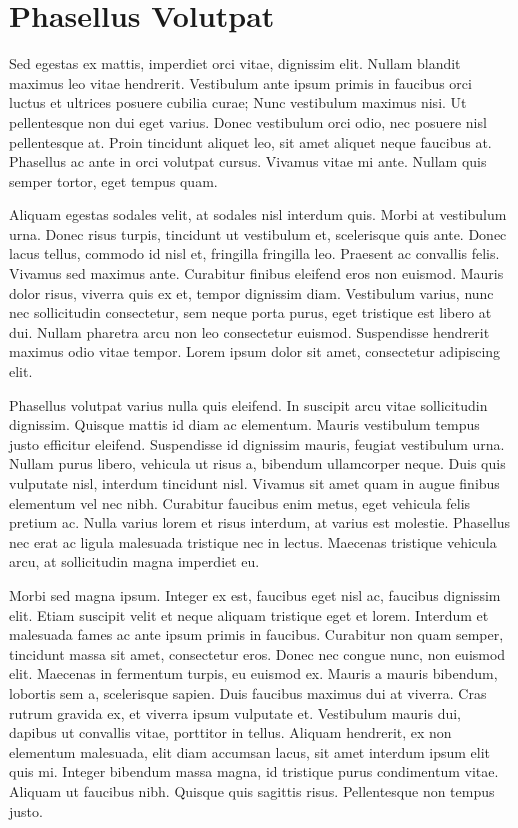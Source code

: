 \appendixhere

\chapter*{Phasellus Volutpat}

Sed egestas ex mattis, imperdiet orci vitae, dignissim elit. Nullam blandit maximus leo vitae hendrerit. Vestibulum ante ipsum primis in faucibus orci luctus et ultrices posuere cubilia curae; Nunc vestibulum maximus nisi. Ut pellentesque non dui eget varius. Donec vestibulum orci odio, nec posuere nisl pellentesque at. Proin tincidunt aliquet leo, sit amet aliquet neque faucibus at. Phasellus ac ante in orci volutpat cursus. Vivamus vitae mi ante. Nullam quis semper tortor, eget tempus quam.

Aliquam egestas sodales velit, at sodales nisl interdum quis. Morbi at vestibulum urna. Donec risus turpis, tincidunt ut vestibulum et, scelerisque quis ante. Donec lacus tellus, commodo id nisl et, fringilla fringilla leo. Praesent ac convallis felis. Vivamus sed maximus ante. Curabitur finibus eleifend eros non euismod. Mauris dolor risus, viverra quis ex et, tempor dignissim diam. Vestibulum varius, nunc nec sollicitudin consectetur, sem neque porta purus, eget tristique est libero at dui. Nullam pharetra arcu non leo consectetur euismod. Suspendisse hendrerit maximus odio vitae tempor. Lorem ipsum dolor sit amet, consectetur adipiscing elit.

Phasellus volutpat varius nulla quis eleifend. In suscipit arcu vitae sollicitudin dignissim. Quisque mattis id diam ac elementum. Mauris vestibulum tempus justo efficitur eleifend. Suspendisse id dignissim mauris, feugiat vestibulum urna. Nullam purus libero, vehicula ut risus a, bibendum ullamcorper neque. Duis quis vulputate nisl, interdum tincidunt nisl. Vivamus sit amet quam in augue finibus elementum vel nec nibh. Curabitur faucibus enim metus, eget vehicula felis pretium ac. Nulla varius lorem et risus interdum, at varius est molestie. Phasellus nec erat ac ligula malesuada tristique nec in lectus. Maecenas tristique vehicula arcu, at sollicitudin magna imperdiet eu.

Morbi sed magna ipsum. Integer ex est, faucibus eget nisl ac, faucibus dignissim elit. Etiam suscipit velit et neque aliquam tristique eget et lorem. Interdum et malesuada fames ac ante ipsum primis in faucibus. Curabitur non quam semper, tincidunt massa sit amet, consectetur eros. Donec nec congue nunc, non euismod elit. Maecenas in fermentum turpis, eu euismod ex. Mauris a mauris bibendum, lobortis sem a, scelerisque sapien. Duis faucibus maximus dui at viverra. Cras rutrum gravida ex, et viverra ipsum vulputate et. Vestibulum mauris dui, dapibus ut convallis vitae, porttitor in tellus. Aliquam hendrerit, ex non elementum malesuada, elit diam accumsan lacus, sit amet interdum ipsum elit quis mi. Integer bibendum massa magna, id tristique purus condimentum vitae. Aliquam ut faucibus nibh. Quisque quis sagittis risus. Pellentesque non tempus justo.

